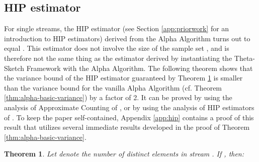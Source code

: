 \documentclass{article}
\newtheorem{theorem}{Theorem}[section]
\begin{document}
\subsection{HIP estimator} 
\label{sec:hipsec} 
For single streams, the HIP estimator (see Section \ref{app:priorwork} for an introduction to HIP estimators) derived from the Alpha 
Algorithm turns out to equal .
This estimator does not involve the size of the sample set , and is therefore not the same thing
as the estimator  derived by instantiating the Theta-Sketch Framework with 
the Alpha Algorithm.
The following theorem shows that the variance bound of the HIP estimator guaranteed by
Theorem \ref{thm:hip} is smaller than the variance bound for the
vanilla Alpha Algorithm (cf. Theorem \ref{thm:alpha-basic-variance}) by a
factor of 2. It 
can be proved by using the analysis of Approximate Counting
of \cite{morris1978counting,flajolet1985approximate},
or by using the analysis of HIP estimators of \cite{cohennew, ting}. To 
keep the paper self-contained, Appendix \ref{app:hip} contains
a proof of this result that utilizes several immediate results developed in the proof of
Theorem \ref{thm:alpha-basic-variance}.


\begin{theorem} \label{thm:hip} Let  denote the number of distinct elements in stream .
If , then: 

\end{theorem}
\end{document}
